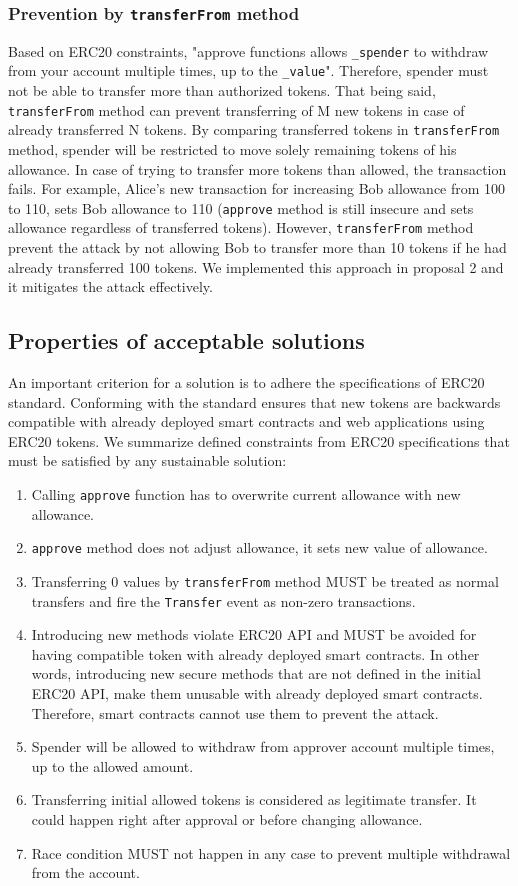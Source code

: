 \subsubsection*{Prevention by \texttt{transferFrom} method} Based on ERC20 constraints, "approve functions allows \texttt{\_spender} to withdraw from your account multiple times, up to the \texttt{\_value}". Therefore, spender must not be able to transfer more than authorized tokens. That being said, \texttt{transferFrom} method can prevent transferring of M new tokens in case of already transferred N tokens. By comparing transferred tokens in \texttt{transferFrom} method, spender will be restricted to move solely remaining tokens of his allowance. In case of trying to transfer more tokens than allowed, the transaction fails. For example, Alice's new transaction for increasing Bob allowance from 100 to 110, sets Bob allowance to 110 (\texttt{approve} method is still insecure and sets allowance regardless of transferred tokens). However, \texttt{transferFrom} method prevent the attack by not allowing Bob to transfer more than 10 tokens if he had already transferred 100 tokens. We implemented this approach in proposal 2 and it mitigates the attack effectively.

\subsection{Properties of acceptable solutions}
An important criterion for a solution is to adhere the specifications of ERC20 standard. Conforming with the standard ensures that new tokens are backwards compatible with already deployed smart contracts and web applications using ERC20 tokens. We summarize defined constraints from ERC20 specifications \cite{Ref08} that must be satisfied by any sustainable solution:

\begin{enumerate}
	\item Calling \texttt{approve} function has to overwrite current allowance with new allowance.
	\item \texttt{approve} method does not adjust allowance, it sets new value of allowance.
	\item Transferring 0 values by \texttt{transferFrom} method MUST be treated as normal transfers and fire the \texttt{Transfer} event as non-zero transactions.
	\item Introducing new methods violate ERC20 API and MUST be avoided for having compatible token with already deployed smart contracts. In other words, introducing new secure methods that are not defined in the initial ERC20 API, make them unusable with already deployed smart contracts. Therefore, smart contracts cannot use them to prevent the attack.
	\item Spender will be allowed to withdraw from approver account multiple times, up to the allowed amount.
	\item Transferring initial allowed tokens is considered as legitimate transfer. It could happen right after approval or before changing allowance.
	\item Race condition MUST not happen in any case to prevent multiple withdrawal from the account.
\end{enumerate}